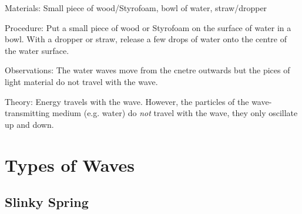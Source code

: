 \begin{multicols}{2}
\begin{description*}
\item[Materials:]{Small piece of wood/Styrofoam, bowl of water, straw/dropper}
\item[Procedure:]{Put a small piece of wood or Styrofoam on the surface of water in a bowl. With a dropper or straw, release a few drops of water onto the centre of the water surface.}
\item[Observations:]{The water waves move from the cnetre outwards but the pices of light material do not travel with the wave.}
\item[Theory:]{Energy travels with the wave. However, the particles of the wave-transmitting medium (e.g. water) do \emph{not} travel with the wave, they only oscillate up and down.}
\end{description*}


\section*{Types of Waves} 


\subsection{Slinky Spring} 



\end{multicols}
